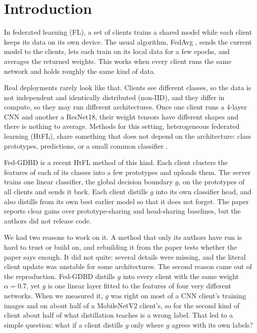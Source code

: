 \documentclass[conference]{IEEEtran}
\begin{document}
\section{Introduction}

In federated learning (FL), a set of clients trains a shared model while each client keeps its data on its own device. The usual algorithm, FedAvg \cite{mcmahan2017fedavg}, sends the current model to the clients, lets each train on its local data for a few epochs, and averages the returned weights. This works when every client runs the same network and holds roughly the same kind of data.

Real deployments rarely look like that. Clients see different classes, so the data is not independent and identically distributed (non-IID), and they differ in compute, so they may run different architectures. Once one client runs a 4-layer CNN and another a ResNet18, their weight tensors have different shapes and there is nothing to average. Methods for this setting, heterogeneous federated learning (HtFL), share something that does not depend on the architecture: class prototypes, predictions, or a small common classifier \cite{zhang2025htfllib}.

Fed-GDBD \cite{zhang2025gdbd} is a recent HtFL method of this kind. Each client clusters the features of each of its classes into a few prototypes and uploads them. The server trains one linear classifier, the global decision boundary $g$, on the prototypes of all clients and sends it back. Each client distills $g$ into its own classifier head, and also distills from its own best earlier model so that it does not forget. The paper reports clear gains over prototype-sharing and head-sharing baselines, but the authors did not release code.

We had two reasons to work on it. A method that only its authors have run is hard to trust or build on, and rebuilding it from the paper tests whether the paper says enough. It did not quite: several details were missing, and the literal client update was unstable for some architectures. The second reason came out of the reproduction. Fed-GDBD distills $g$ into every client with the same weight $\alpha=0.7$, yet $g$ is one linear layer fitted to the features of four very different networks. When we measured it, $g$ was right on most of a CNN client's training images and on about half of a MobileNetV2 client's, so for the second kind of client about half of what distillation teaches is a wrong label. That led to a simple question: what if a client distills $g$ only where $g$ agrees with its own labels?
\end{document}
